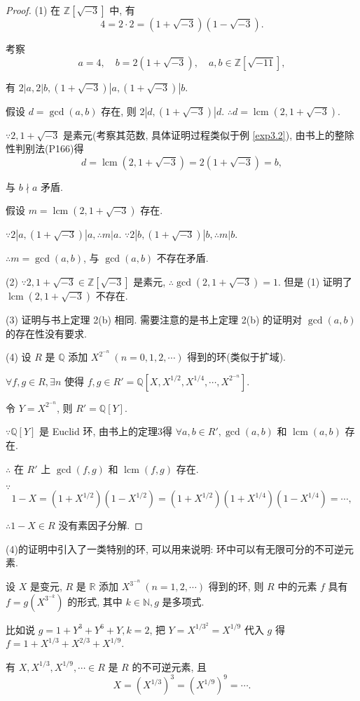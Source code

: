 \documentclass[UTF8]{ctexart}
\begin{document}
\begin{proof}
    (1) 在 $\mathbb{Z}[\sqrt{-3}]$ 中, 有
    \[4=2\cdot2=(1+\sqrt{-3})(1-\sqrt{-3}).\]

    考察
    \[a=4,\quad b=2(1+\sqrt{-3}),\quad a,b\in\mathbb{Z}[\sqrt{-11}],\]

    有 $2|a,2|b,(1+\sqrt{-3})|a,(1+\sqrt{-3})|b$.

    假设 $d=\gcd(a,b)$ 存在, 则 $2|d,(1+\sqrt{-3})|d$. $\therefore d=\operatorname{lcm}(2,1+\sqrt{-3})$.

    $\because 2,1+\sqrt{-3}$ 是素元(考察其范数, 具体证明过程类似于例 \ref{exp3.2}), 由书上的整除性判别法(P166)得
    \[d=\operatorname{lcm}(2,1+\sqrt{-3})=2(1+\sqrt{-3})=b,\]

    与 $b\nmid a$ 矛盾.

    假设 $m=\operatorname{lcm}(2,1+\sqrt{-3})$ 存在.

    $\because 2|a,(1+\sqrt{-3})|a,\therefore m|a$. $\because 2|b,(1+\sqrt{-3})|b,\therefore m|b$.

    $\therefore m=\gcd(a,b)$, 与 $\gcd(a,b)$ 不存在矛盾.

    (2) $\because 2,1+\sqrt{-3}\in\mathbb{Z}[\sqrt{-3}]$ 是素元, $\therefore\gcd(2,1+\sqrt{-3})=1$. 但是 (1) 证明了 $\operatorname{lcm}(2,1+\sqrt{-3})$ 不存在.

    (3) 证明与书上定理 2(b) 相同. 需要注意的是书上定理 2(b) 的证明对 $\gcd(a,b)$ 的存在性没有要求.

    (4) 设 $R$ 是 $\mathbb{Q}$ 添加 $X^{2^{-n}}\ (n=0,1,2,\cdots)$ 得到的环(类似于扩域).

    $\forall f,g\in R,\exists n$ 使得 $f,g\in R'=\mathbb{Q}[X,X^{1/2},X^{1/4},\cdots,X^{2^{-n}}]$.

    令 $Y=X^{2^{-n}}$, 则 $R'=\mathbb{Q}[Y]$.

    $\because\mathbb{Q}[Y]$ 是 Euclid 环, 由书上的定理3得 $\forall a,b\in R',\gcd(a,b)$ 和 $\operatorname{lcm}(a,b)$ 存在.

    $\therefore$ 在 $R'$ 上 $\gcd(f,g)$ 和 $\operatorname{lcm}(f,g)$ 存在.


    $\because$
    \[1-X=(1+X^{1/2})(1-X^{1/2})=(1+X^{1/2})(1+X^{1/4})(1-X^{1/4})=\cdots,\]

    $\therefore 1-X\in R$ 没有素因子分解.
\end{proof}
\begin{note}
    (4)的证明中引入了一类特别的环, 可以用来说明: 环中可以有无限可分的不可逆元素.
\end{note}
\begin{example}
    设 $X$ 是变元, $R$ 是 $\mathbb{R}$ 添加 $X^{3^{-n}}\ (n=1,2,\cdots)$ 得到的环, 则 $R$ 中的元素 $f$ 具有 $f=g(X^{3^{-k}})$ 的形式, 其中 $k\in\mathbb{N},g$ 是多项式.

    比如说 $g=1+Y^3+Y^6+Y,k=2$, 把 $Y=X^{1/3^2}=X^{1/9}$ 代入 $g$ 得 $f=1+X^{1/3}+X^{2/3}+X^{1/9}$.

    有 $X,X^{1/3},X^{1/9},\cdots\in R$ 是 $R$ 的不可逆元素, 且
    \[X=(X^{1/3})^3=(X^{1/9})^9=\cdots.\]
\end{example}
\end{document}
